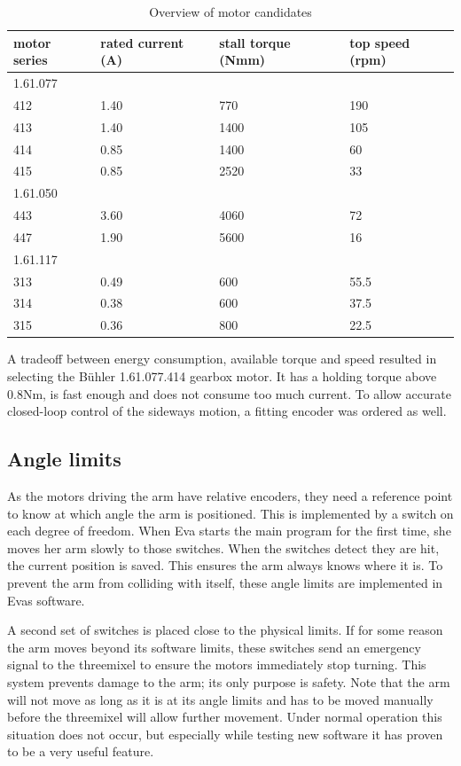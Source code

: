 \documentclass[technical_document.tex]{subfiles}
\begin{document}
\begin{table}[h]
\begin{tabular}{| p{3cm} | p{3cm} | p{3cm} | p{3cm} |}
\hline
motor series	&	rated current (A)	&	stall torque (Nmm)	&	top speed (rpm)	\\
\hline
1.61.077		&						&						&					\\
412				&	1.40				&	770					&	190				\\
413				&	1.40				&	1400				&	105				\\
414				&	0.85				&	1400				&	60				\\
415				&	0.85				&	2520				&	33				\\
\hline
1.61.050		&						&						&					\\
443				&	3.60				&	4060				&	72				\\
447				&	1.90				&	5600				&	16				\\
\hline
1.61.117		&						&						&					\\
313				&	0.49				&	600					&	55.5			\\
314				&	0.38				&	600					&	37.5			\\
315				&	0.36				&	800					&	22.5			\\

\hline
\end{tabular}
\caption{Overview of motor candidates}
\label{table:motors}
\end{table}


A tradeoff between energy consumption, available torque and speed resulted in selecting the B\"{u}hler 1.61.077.414 gearbox motor. It has a holding torque above 0.8Nm, is fast enough and does not consume too much current. To allow accurate closed-loop control of the sideways motion, a fitting encoder was ordered as well.


\subsection{Angle limits}

As the motors driving the arm have relative encoders, they need a reference point to know at which angle the arm is positioned. This is implemented by a switch on each degree of freedom. When Eva starts the main program for the first time, she moves her arm slowly to those switches. When the switches detect they are hit, the current position is saved. This ensures the arm always knows where it is. To prevent the arm from colliding with itself, these angle limits are implemented in Eva\textquotesingle{}s software.

A second set of switches is placed close to the physical limits. If for some reason the arm moves beyond its software limits, these switches send an emergency signal to the threemixel to ensure the motors immediately stop turning. This system prevents damage to the arm; its only purpose is safety. Note that the arm will not move as long as it is at its angle limits and has to be moved manually before the threemixel will allow further movement. Under normal operation this situation does not occur, but especially while testing new software it has proven to be a very useful feature.
\end{document}
